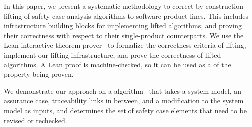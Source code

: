 In this paper, we present a systematic methodology to correct-by-construction lifting of safety case analysis algorithms to software product lines. This includes infrastructure building blocks for implementing lifted algorithms, and proving their correctness with respect to their single-product counterparts. We use the Lean interactive theorem prover~\cite{deMoura:2015} to formalize the correctness criteria of lifting, implement our lifting infrastructure, and prove the correctness of lifted algorithms. A Lean proof is machine-checked, so it can be used as a  of the property being proven.

We demonstrate our approach on a  algorithm~\cite{Kokaly:2017} that takes a system model, an assurance case, traceability links in between, and a modification to the system model as inputs, and determines the set of safety case elements that need to be revised or rechecked.





